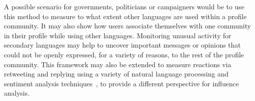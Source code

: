 \documentclass{llncs}
\begin{document}
A possible scenario for governments, politicians or campaigners would
be to use this method to measure to what extent other languages are
used within a profile community. It may also show how users associate
themselves with one community in their profile while using other
languages. Monitoring unusual activity for secondary languages may
help to uncover important messages or opinions that could not be
openly expressed, for a variety of reasons, to the rest of the profile
community. This framework may also be extended to measure reactions
via retweeting and replying using a variety of natural language
processing and sentiment analysis
techniques~\cite{mostafa-et-al-ai2016}, to provide a different
perspective for influence analysis.





\end{document}
